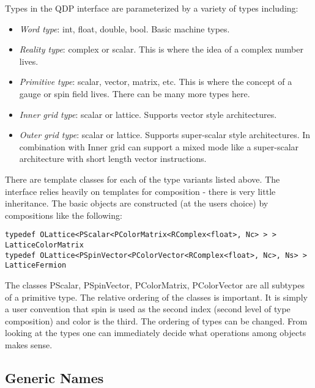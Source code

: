 \documentclass[12pt,letterpaper]{article}
\begin{document}
Types in the QDP interface are parameterized by a variety of types including:
\begin{itemize}
\item {\em Word type}: 
  int, float, double, bool. Basic machine types.
\item {\em Reality type}: 
  complex or scalar. This is where the idea of a complex number
  lives.
\item {\em Primitive type}: 
  scalar, vector, matrix, etc. This is where the concept of a gauge or
  spin field lives. There can be many more types here.
\item {\em Inner grid type}: 
  scalar or lattice. Supports vector style architectures.
\item {\em Outer grid type}:
  scalar or lattice. Supports super-scalar style architectures. In
  combination with Inner grid can support a mixed mode like a
  super-scalar architecture with short length vector instructions.
\end{itemize}

There are template classes for each of the type variants listed
above. The interface relies heavily on templates for
composition - there is very little inheritance. The basic objects are
constructed (at the users choice) by compositions like the following:

\begin{small}
\begin{verbatim}
typedef OLattice<PScalar<PColorMatrix<RComplex<float>, Nc> > > LatticeColorMatrix
typedef OLattice<PSpinVector<PColorVector<RComplex<float>, Nc>, Ns> > LatticeFermion
\end{verbatim}
\end{small}
%
The classes PScalar, PSpinVector, PColorMatrix,
PColorVector are all subtypes of a primitive type. The relative
ordering of the classes is important. It is simply a user convention
that spin is used as the second index (second level of type
composition) and color is the third. The ordering of types can be
changed. From looking at the types one can immediately decide what
operations among objects makes sense.


\subsection{Generic Names}
\end{document}
